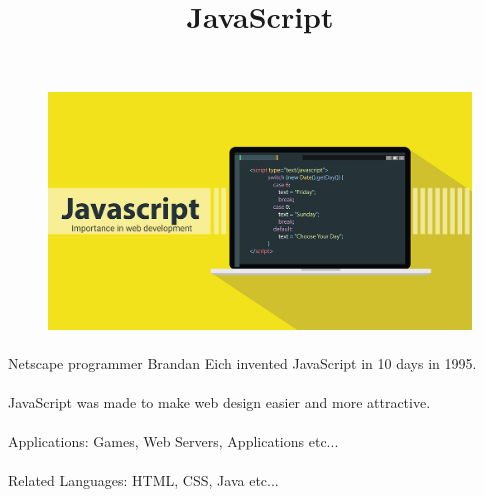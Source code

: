 \documentclass{article}
\begin{document}
	\newpage
	\title{JavaScript}
	\begin{figure}	
		\includegraphics[width=\linewidth]{javascript.jpg}
	\end{figure}
	
	\newpage
	\paragraph{}
	Netscape programmer Brandan Eich invented JavaScript in 10 days in 1995.
	\paragraph{}
	JavaScript was made to make web design easier and more attractive.
	\paragraph{}
	Applications: Games, Web Servers, Applications etc...
	\paragraph{}
	Related Languages: HTML, CSS, Java etc...
\end{document}
